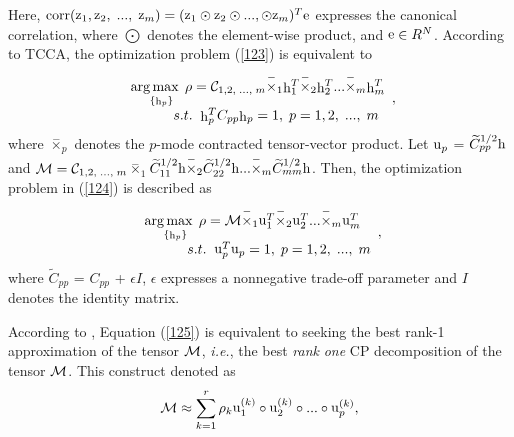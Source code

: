 \documentclass{sig-alternate-05-2015}
\begin{document}
Here, ${\mathop{\rm corr}\nolimits} ({{\mathop{\rm z}\nolimits} _1},{{\mathop{\rm z}\nolimits} _2},\;...,\;{{\mathop{\rm z}\nolimits} _m}) = {({{\mathop{\rm z}\nolimits} _1} \odot {{\mathop{\rm z}\nolimits} _2} \odot ..., \odot {{\mathop{\rm z}\nolimits} _m})^T}{\rm e}$ expresses the canonical correlation, where $\bigodot$ denotes the element-wise product, and ${\mathop{\rm e}\nolimits}  \in {R^N}$. According to TCCA, the optimization problem (\ref{123}) is equivalent to
\begin{equation}\label{}
\begin{array}{l}
\mathop {\arg \max \;\rho }\limits_{\{ {{\mathop{\rm h}\nolimits} _p}\} }  = {{\cal C}_{1,2,\;...,\;m}}{\mathop  \times \limits^ -}_1{\mathop{\rm h}\nolimits} _1^T{\mathop  \times \limits^ -}_2{\mathop{\rm h}\nolimits} _2^T...{\mathop  \times \limits^-}_m{\mathop{\rm h}\nolimits} _m^T\\
\;\;\;\;\;\;\;\;\;\;\;s.t.\;\;{\mathop{\rm h}\nolimits} _p^T{C_{pp}}{{\mathop{\rm h}\nolimits} _p} = 1,\;p = 1,2,\;...,\;m
\end{array},
\label{124}
\end{equation}
where ${{\mathop\times \limits^ -}_p}$ denotes the $p$-mode contracted tensor-vector product. Let  ${{\mathop{\rm u}\nolimits} _p}$ = $\widetilde{C}_{pp}^{1/2}{\rm h}$ and ${\cal M} = {{\cal C}_{1,2,\;...,\;m}}$${\mathop  \times \limits^-}_1$${\widetilde{C}_{11}^{1/2}{\rm h}} {\mathop  \times \limits^ -}_2 \widetilde{C}_{22}^{1/2}{\rm h}\\...{\mathop  \times \limits^ -}_m \widetilde{C}_{mm}^{1/2}{\rm h}$. Then, the optimization problem in (\ref{124}) is described as
\begin{equation}\label{}
\begin{array}{l}
\mathop {\arg \max \;\rho }\limits_{\{ {{\mathop{\rm h}\nolimits} _p}\} }  = {\cal M}{\mathop  \times \limits^ -}_1{\mathop{\rm u}\nolimits} _1^T{\mathop  \times \limits^ -}_2{\mathop{\rm u}\nolimits} _2^T...{\mathop  \times \limits^ -}_m{\mathop{\rm u}\nolimits} _m^T\\
\;\;\;\;\;\;\;\;\;\;\;s.t.\;\;{\mathop{\rm u}\nolimits} _p^T{{\mathop{\rm u}\nolimits} _p} = 1,\;p = 1,2,\;...,\;m
\end{array},
\label{125}
 \end{equation}
where $\widetilde{C}_{pp}$ = $C_{pp}$ + $\epsilon I$, $\epsilon$ expresses a nonnegative trade-off parameter and $I$ denotes the identity matrix.

According to \cite{Lathauwer2006On}, Equation (\ref{125}) is equivalent to seeking the best rank-1 approximation of the tensor $\cal M$, {\em i.e.}, the best {\em rank} {\em one} CP decomposition of the tensor $\cal M$. This construct denoted as
\begin{equation}\label{}
{\cal M} \approx \sum\limits_{k = 1}^r {{\rho _k}} {\mathop{\rm u}\nolimits} _1^{(k)} \circ {\mathop{\rm u}\nolimits} _2^{(k)} \circ ... \circ {\mathop{\rm u}\nolimits} _p^{(k)},
\label{126}
\end{equation}
\end{document}
